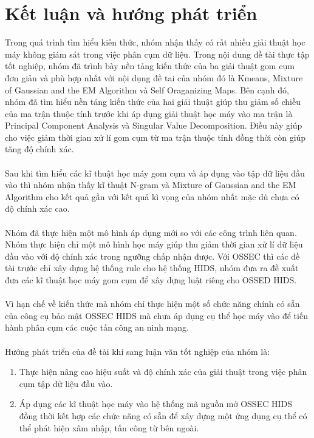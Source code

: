 \chapter{Kết luận và hướng phát triển}
Trong quá trình tìm hiểu kiến thức, nhóm nhận thấy có rất nhiều giải thuật học
máy không giám sát trong việc phân cụm dữ liệu. Trong nội dung đề tài thực tập
tốt nghiệp, nhóm đã trình bày nền tảng kiến thức của ba giải thuật gom cụm đơn
giản và phù hợp nhất với nội dụng đề tai của nhóm đó là Kmeans, Mixture of
Gaussian and the EM Algorithm và Self Oraganizing Maps. Bên cạnh đó, nhóm đã tìm
hiểu nền tảng kiến thức của hai giải thuật giúp thu giảm số chiều của ma trận
thuộc tính trước khi áp dụng giải thuật học máy vào ma trận là Principal
Component Analysis và Singular Value Decomposition. Điều này giúp cho việc giảm
thời gian xử lí gom cụm từ ma trận thuộc tính đồng thời còn giúp tăng độ chính
xác.\\\\ 
Sau khi tìm hiểu các kĩ thuật học máy gom cụm và áp dụng vào tập
dữ liệu đầu vào thì nhóm nhận thấy kĩ thuật N-gram và Mixture of 
Gaussian and the EM Algorithm cho kết quả gần với kết quả kì vọng của nhóm nhất mặc dù
chưa có độ chính xác cao.\\\\ 
Nhóm đã thực hiện một mô hình áp dụng mới so
với các công trình liên quan. Nhóm thực hiện chỉ một mô hình học máy giúp thu
giảm thời gian xử lí dữ liệu đầu vào với độ chính xác trong ngưỡng chấp nhận
được. Với OSSEC thì các đề tài trước chỉ xây dựng hệ thống rule cho hệ thống
HIDS, nhóm đưa ra đề xuất đưa các kĩ thuật học máy gom cụm để xây dựng luật
riêng cho OSSED HIDS.\\\\ 
Vì hạn chế về kiến thức mà nhóm chỉ thực hiện
một số chức năng chính có sẵn của công cụ bảo mật OSSEC HIDS mà chưa áp dụng cụ
thể học máy vào để tiến hành phân cụm các cuộc tấn công an ninh mạng.\\\\ 
Hướng phát triển của đề tài khi sang luận văn tốt nghiệp của nhóm là:
\begin{enumerate}
  \item Thực hiện nâng cao hiệu suất và độ chính xác của giải thuật trong việc
  phân cụm tập dữ liệu đầu vào.
  \item Áp dụng các kĩ thuật học máy vào hệ thống mã nguồn mở OSSEC HIDS đồng
  thời kết hợp các chức năng có sẵn để xây dựng một ứng dụng cụ thể có thể phát hiện xâm nhập, tấn công từ bên ngoài.
\end{enumerate}